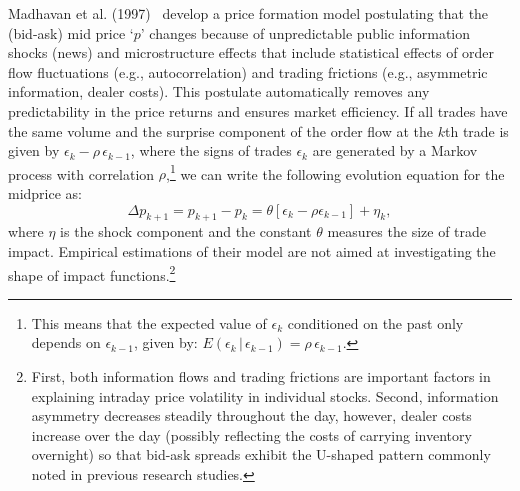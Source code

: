Madhavan et al. (1997)~\cite{madhaven1997} develop a price formation model postulating that the (bid-ask) mid price `$p$' changes because of unpredictable public information shocks (news) and microstructure effects that include statistical effects of order flow fluctuations (e.g., autocorrelation) and trading frictions (e.g., asymmetric information, dealer costs). This postulate automatically removes any predictability in the price returns and ensures market efficiency. If all trades have the same volume and the surprise component of the order flow at the $k$th trade is given by $\epsilon_k - \rho \,\epsilon_{k-1}$, where the signs of trades $\epsilon_k$ are generated by a Markov process with correlation $\rho$,\footnote{This means that the expected value of $\epsilon_k$ conditioned on the past only depends on $\epsilon_{k-1}$, given by: $E(\epsilon_k\,|\,\epsilon_{k-1})=\rho\,\epsilon_{k-1}$.}  we can write the following evolution equation for the midprice as:
	\begin{equation} \label{eqn:midpointdelta}
	\Delta p_{k+1}= p_{k+1} - p_k= \theta[ \epsilon_k - \rho \epsilon_{k-1}] + \eta_k,
	\end{equation}
where $\eta$ is the shock component and the constant $\theta$ measures the size of trade impact. Empirical estimations of their model are not aimed at investigating the shape of impact functions.\footnote{First, both information flows and trading frictions are important factors in explaining intraday price volatility in individual stocks. Second, information asymmetry decreases steadily throughout the day, however, dealer costs increase over the day (possibly reflecting the costs of carrying inventory overnight) so that bid-ask spreads exhibit the U-shaped pattern commonly noted in previous research studies.}


